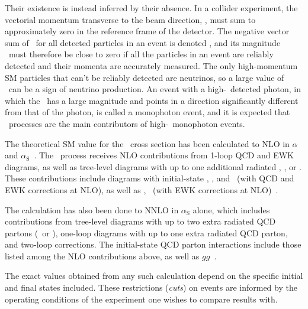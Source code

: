 Their existence is instead inferred by their absence.
In a collider experiment, the vectorial momentum transverse to the beam direction, \vecpT, must sum to approximately zero in the reference frame of the
detector. The negative vector sum of \vecpT\ for all detected particles in an event is denoted \vecMET, and its magnitude \MET\ must therefore be close
to zero if all the particles in an event are reliably detected and their momenta are accurately measured. The only high-momentum SM particles that can't
be reliably detected are neutrinos, so a large value of \MET\ can be a sign of neutrino production. An event with a high-\pT\ detected photon, in which
the \vecMET\ has a large magnitude and points in a direction significantly different from that of the photon, is called a monophoton event, and it is
expected that \zinvg\ processes are the main contributors of high-\pT\ monophoton events.

The theoretical SM value for the \zinvg\ cross section has been calculated to NLO in $\alpha$ and $\alpha_\mathrm{S}$~\cite{ref:JHEP04(2015)018, ref:JHEP02(2016)057}.
The \zinvg\ process receives NLO contributions from 1-loop QCD and EWK diagrams, as well as tree-level diagrams with up to one additional radiated \Pgamma, \Pq, or \Pg.
These contributions include diagrams with initial-state \Pq\Paq, \Pq\Pg, and \Paq\Pg\ (with QCD and EWK corrections at NLO), as well as \Pq\Pgamma, \Paq\Pgamma\ (with EWK corrections
at NLO)~\cite{ref:JHEP02(2016)057}.

The calculation has also been done to NNLO in $\alpha_\mathrm{S}$ alone,
which includes contributions from tree-level diagrams with up to two extra radiated QCD partons (\Pq\ or \Pg), one-loop diagrams with up to one extra
radiated QCD parton, and two-loop corrections. The initial-state QCD parton interactions include those listed among the NLO contributions above,
as well as $gg$~\cite{ref:j.physletb.2014.02.037, ref:JHEP07(2015)085}.

The exact values obtained from any such calculation depend on the specific initial and final states included. These restrictions (\textit{cuts}) on events are
informed by the operating conditions of the experiment one wishes to compare results with.

